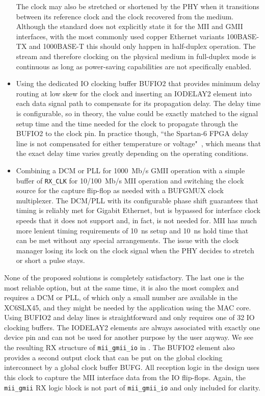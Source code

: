 \documentclass[a4paper, 11pt, oneside]{Thesis}  %
\begin{document}
\begin{itemize}
The clock may also be stretched or shortened by the PHY when it transitions between its reference clock and the clock recovered from the medium. Although the standard does not explicitly state it for the MII and GMII interfaces, with the most commonly used copper Ethernet variants 100BASE-TX and 1000BASE-T this should only happen in half-duplex operation. The stream and therefore clocking on the physical medium in full-duplex mode is continuous as long as power-saving capabilities are not specifically enabled.
\item Using the dedicated IO clocking buffer BUFIO2 that provides minimum delay routing at low skew for the clock and inserting an IODELAY2 element into each data signal path to compensate for its propagation delay. The delay time is configurable, so in theory, the value could be exactly matched to the signal setup time and the time needed for the clock to propagate through the BUFIO2 to the clock pin. In practice though, ``the Spartan-6 FPGA delay line is not compensated for either temperature or voltage"~\cite{S6SelectIO}, which means that the exact delay time varies greatly depending on the operating conditions.
\item Combining a DCM or PLL for 1000~Mb/s GMII operation with a simple buffer of \texttt{RX\_CLK} for 10/100~Mb/s MII operation and switching the clock source for the capture flip-flop as needed with a BUFGMUX clock multiplexer. The DCM/PLL with its configurable phase shift guarantees that timing is reliably met for Gigabit Ethernet, but is bypassed for interface clock speeds that it does not support and, in fact, is not needed for. MII has much more lenient timing requirements of 10~ns setup and 10~ns hold time that can be met without any special arrangements. The issue with the clock manager losing its lock on the clock signal when the PHY decides to stretch or short a pulse stays.
\end{itemize}

None of the proposed solutions is completely satisfactory. The last one is the most reliable option, but at the same time, it is also the most complex and requires a DCM or PLL, of which only a small number are available in the XC6SLX45, and they might be needed by the application using the MAC core. Using BUFIO2 and delay lines is straightforward and only requires one of 32 IO clocking buffers. The IODELAY2 elements are always associated with exactly one device pin and can not be used for another purpose by the user anyway. We see the resulting RX structure of \texttt{mii\_gmii\_io} in . The BUFIO2 element also provides a second output clock that can be put on the global clocking interconnect by a global clock buffer BUFG. All reception logic in the design uses this clock to capture the MII interface data from the IO flip-flops. Again, the \texttt{mii\_gmii} RX logic block is not part of \texttt{mii\_gmii\_io} and only included for clarity.
\end{document}
